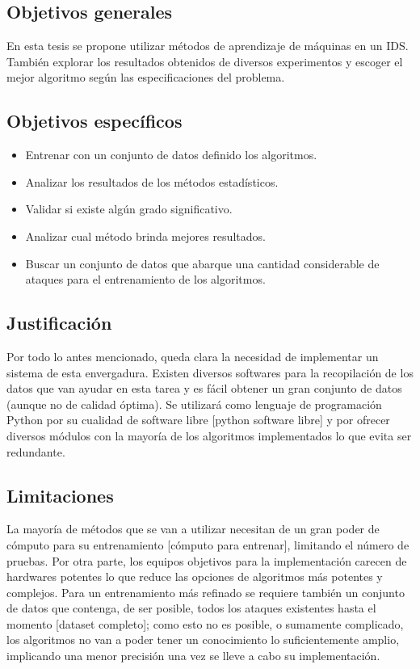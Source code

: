 \subsection*{Objetivos generales}
En esta tesis se propone utilizar métodos de aprendizaje de máquinas en un IDS. También explorar los resultados obtenidos de diversos experimentos y escoger el mejor algoritmo según las especificaciones del problema.

\subsection*{Objetivos específicos}
\begin{itemize}
    \item Entrenar con un conjunto de datos definido los algoritmos.
    \item Analizar los resultados de los métodos estadísticos.
    \item Validar si existe algún grado significativo.
    \item Analizar cual método brinda mejores resultados.
    \item Buscar un conjunto de datos que abarque una cantidad considerable de ataques para el entrenamiento de los algoritmos.
\end{itemize}

\subsection*{Justificación}
Por todo lo antes mencionado, queda clara la necesidad de implementar un sistema de esta envergadura. Existen diversos softwares para la recopilación de los datos que van ayudar en esta tarea y es fácil obtener un gran conjunto de datos (aunque no de calidad óptima). Se utilizará como lenguaje de programación Python por su cualidad de software libre [python software libre] y por ofrecer diversos módulos con la mayoría de los algoritmos implementados lo que evita ser redundante.

\subsection*{Limitaciones}
La mayoría de métodos que se van a utilizar necesitan de un gran poder de cómputo para su entrenamiento [cómputo para entrenar], limitando el número de pruebas. Por otra parte, los equipos objetivos para la implementación carecen de hardwares potentes lo que reduce las opciones de algoritmos más potentes y complejos. Para un entrenamiento más refinado se requiere también un conjunto de datos que contenga, de ser posible, todos los ataques existentes hasta el momento [dataset completo]; como esto no es posible, o sumamente complicado, los algoritmos no van a poder tener un conocimiento lo suficientemente amplio, implicando una menor precisión una vez se lleve a cabo su implementación.
